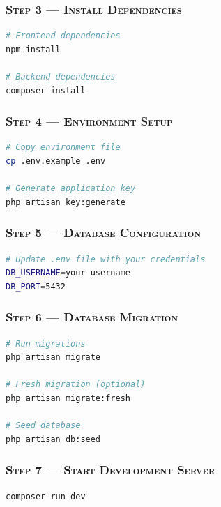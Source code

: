 \documentclass[12pt,letterpaper]{article}
\begin{document}
\subsubsection*{\textsc{Step 3 — Install Dependencies}}
\begin{lstlisting}[language=bash]
# Frontend dependencies
npm install

# Backend dependencies
composer install
\end{lstlisting}

\subsubsection*{\textsc{Step 4 — Environment Setup}}
\begin{lstlisting}[language=bash]
# Copy environment file
cp .env.example .env

# Generate application key
php artisan key:generate
\end{lstlisting}

\subsubsection*{\textsc{Step 5 — Database Configuration}}
\begin{lstlisting}[language=bash]
# Update .env file with your credentials
DB_USERNAME=your-username
DB_PORT=5432
\end{lstlisting}

\subsubsection*{\textsc{Step 6 — Database Migration}}
\begin{lstlisting}[language=bash]
# Run migrations
php artisan migrate

# Fresh migration (optional)
php artisan migrate:fresh

# Seed database
php artisan db:seed
\end{lstlisting}

\subsubsection*{\textsc{Step 7 — Start Development Server}}
\begin{lstlisting}[language=bash]
composer run dev
\end{lstlisting}
\end{document}
